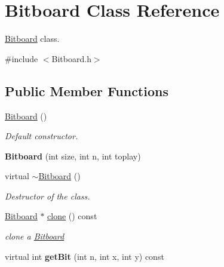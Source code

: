 \hypertarget{class_bitboard}{\section{Bitboard Class Reference}
\label{class_bitboard}
}


\hyperlink{class_bitboard}{Bitboard} class.  




{\ttfamily \#include $<$Bitboard.\+h$>$}

\subsection*{Public Member Functions}
\begin{DoxyCompactItemize}
\item 
\hyperlink{class_bitboard_adf47222b0cd401b3ec6c762a953fadf1}{Bitboard} ()
\begin{DoxyCompactList}\small\item\em Default constructor. \end{DoxyCompactList}\item 
\hypertarget{class_bitboard_a8c1ae6b5f4b54c6118e44c503238f3e4}{{\bfseries Bitboard} (int size, int n, int toplay)}\label{class_bitboard_a8c1ae6b5f4b54c6118e44c503238f3e4}

\item 
\hypertarget{class_bitboard_ad2688925653206f405e9e456c87a3142}{virtual \hyperlink{class_bitboard_ad2688925653206f405e9e456c87a3142}{$\sim$\+Bitboard} ()}\label{class_bitboard_ad2688925653206f405e9e456c87a3142}

\begin{DoxyCompactList}\small\item\em Destructor of the class. \end{DoxyCompactList}\item 
\hypertarget{class_bitboard_a0e8d35fe97c43f0be6a3ba87182dfaa4}{\hyperlink{class_bitboard}{Bitboard} $\ast$ \hyperlink{class_bitboard_a0e8d35fe97c43f0be6a3ba87182dfaa4}{clone} () const }\label{class_bitboard_a0e8d35fe97c43f0be6a3ba87182dfaa4}

\begin{DoxyCompactList}\small\item\em clone a \hyperlink{class_bitboard}{Bitboard} \end{DoxyCompactList}\item 
\hypertarget{class_bitboard_a389593cc6921d71f5d9b15d551d3f303}{virtual int {\bfseries get\+Bit} (int n, int x, int y) const }\label{class_bitboard_a389593cc6921d71f5d9b15d551d3f303}


\end{DoxyCompactItemize}
